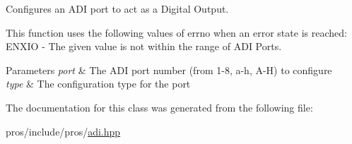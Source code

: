 Configures an A\+DI port to act as a Digital Output.

This function uses the following values of errno when an error state is reached\+: E\+N\+X\+IO -\/ The given value is not within the range of A\+DI Ports.


\begin{DoxyParams}{Parameters}
{\em port} & The A\+DI port number (from 1-\/8, \textquotesingle{}a\textquotesingle{}-\/\textquotesingle{}h\textquotesingle{}, \textquotesingle{}A\textquotesingle{}-\/\textquotesingle{}H\textquotesingle{}) to configure \\
\hline
{\em type} & The configuration type for the port \\
\hline
\end{DoxyParams}


The documentation for this class was generated from the following file\+:\begin{DoxyCompactItemize}
\item 
pros/include/pros/\hyperlink{adi_8hpp}{adi.\+hpp}\end{DoxyCompactItemize}
